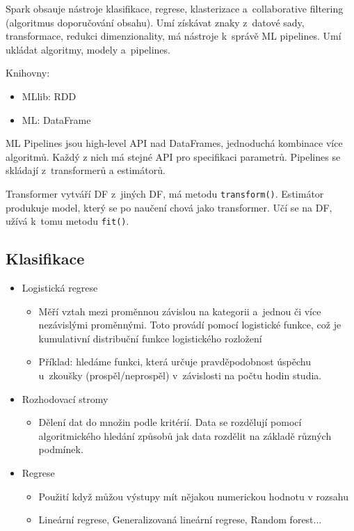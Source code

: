 Spark obsauje nástroje klasifikace, regrese, klasterizace a~collaborative filtering (algoritmus doporučování obsahu). Umí získávat znaky z~datové sady, transformace, redukci dimenzionality, má nástroje k~správě ML pipelines. Umí ukládat algoritmy, modely a~pipelines.

Knihovny:
\begin{itemize}
    \item MLlib: RDD
    \item ML: DataFrame
\end{itemize}

ML Pipelines jsou high-level API nad DataFrames, jednoduchá kombinace více algoritmů. Každý z nich má stejné API pro specifikaci parametrů. Pipelines se skládají z~transformerů a estimátorů.

Transformer vytváří DF z~jiných DF, má metodu \texttt{transform()}. Estimátor produkuje model, který se po naučení chová jako transformer. Učí se na DF, užívá k~tomu metodu \texttt{fit()}.

\subsection{Klasifikace}
\begin{itemize}
    \item Logistická regrese
    \begin{itemize}
        \item Měří vztah mezi proměnnou závislou na kategorii a~jednou či více nezávislými proměnnými. Toto provádí pomocí logistické funkce, což je kumulativní distribuční funkce logistického rozložení
        \item Příklad: hledáme funkci, která určuje pravděpodobnost úspěchu u~zkoušky (prospěl/neprospěl) v~závislosti na počtu hodin studia.
    \end{itemize}
    \item Rozhodovací stromy
    \begin{itemize}
        \item Dělení dat do množin podle kritérií. Data se rozdělují pomocí algoritmického hledání způsobů jak data rozdělit na základě různých podmínek.
    \end{itemize}
    \item Regrese
    \begin{itemize}
        \item Použití když můžou výstupy mít nějakou numerickou hodnotu v rozsahu
        \item Lineární regrese, Generalizovaná lineární regrese, Random forest... 
    \end{itemize}
\end{itemize}

